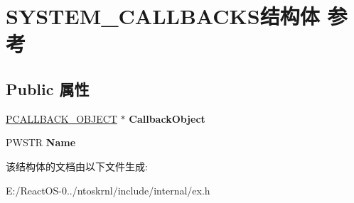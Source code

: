 \hypertarget{struct_s_y_s_t_e_m___c_a_l_l_b_a_c_k_s}{}\section{S\+Y\+S\+T\+E\+M\+\_\+\+C\+A\+L\+L\+B\+A\+C\+K\+S结构体 参考}
\label{struct_s_y_s_t_e_m___c_a_l_l_b_a_c_k_s}
\subsection*{Public 属性}
\begin{DoxyCompactItemize}
\item 
\mbox{\label{struct_s_y_s_t_e_m___c_a_l_l_b_a_c_k_s_a8c076efe45da2f8c619788612a7082fc}} 
\hyperlink{struct___c_a_l_l_b_a_c_k___o_b_j_e_c_t}{P\+C\+A\+L\+L\+B\+A\+C\+K\+\_\+\+O\+B\+J\+E\+CT} $\ast$ {\bfseries Callback\+Object}
\item 
\mbox{\label{struct_s_y_s_t_e_m___c_a_l_l_b_a_c_k_s_a8e4e2f4f9482c1a0826f1d2e034fbd28}} 
P\+W\+S\+TR {\bfseries Name}
\end{DoxyCompactItemize}


该结构体的文档由以下文件生成\+:\begin{DoxyCompactItemize}
\item 
E\+:/\+React\+O\+S-\/0../ntoskrnl/include/internal/ex.\+h\end{DoxyCompactItemize}

